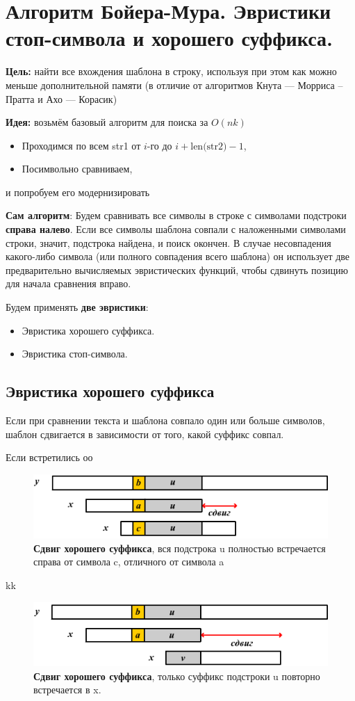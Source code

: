 \section{Алгоритм Бойера-Мура. Эвристики стоп-символа и хорошего суффикса.}

\textbf{Цель:} найти все вхождения шаблона в строку, используя при этом как можно меньше дополнительной памяти (в отличие от алгоритмов Кнута --- Морриса -- Пратта и Ахо --- Корасик)

\textbf{Идея:} возьмём базовый алгоритм для поиска за $O(nk)$
\begin{itemize}
	\item Проходимся по всем \textsf{str1} от $i$-го до $i+\text{len(str2)}-1$,
	\item Посимвольно сравниваем,
\end{itemize}
и попробуем его модернизировать

\textbf{Сам алгоритм}:
Будем сравнивать все символы в строке с символами подстроки \textbf{справа налево}. 
Если все символы шаблона совпали с наложенными символами строки, значит, подстрока найдена, и поиск окончен. 
В случае несовпадения какого-либо символа (или полного совпадения всего шаблона) он использует две предварительно вычисляемых эвристических функций, чтобы сдвинуть позицию для начала сравнения вправо.

Будем применять \textbf{две эвристики}:
\begin{itemize}
	\item Эвристика хорошего суффикса.
	\item Эвристика стоп-символа.
\end{itemize}

\subsection{Эвристика хорошего суффикса}

Если при сравнении текста и шаблона совпало один или больше символов, шаблон сдвигается в зависимости от того, какой суффикс совпал.

Если встретились оо
\begin{figure}[h!]
	\centering
	\includegraphics[width=0.7\linewidth]{img/10_1.png}
	\captionsetup{labelformat=empty}
	\caption{\textbf{Сдвиг хорошего суффикса}, вся подстрока u полностью встречается справа от символа c, отличного от символа a}
\end{figure}
kk
\begin{figure}[h!]
	\centering
	\includegraphics[width=0.7\linewidth]{img/10_2.png}
	\captionsetup{labelformat=empty}
	\caption{\textbf{Сдвиг хорошего суффикса}, только суффикс подстроки u повторно встречается в x.}
\end{figure}



